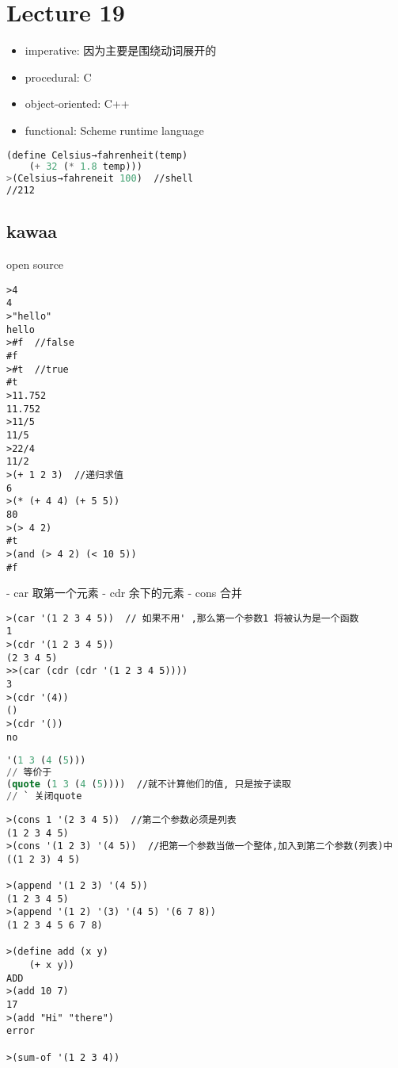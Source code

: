 \documentclass{article}
\begin{document}
\section{Lecture 19}
\begin{itemize}
\item imperative: 因为主要是围绕动词展开的
\item procedural: C
\item object-oriented: C++
\item functional: Scheme runtime language
\end{itemize}

\begin{lstlisting}[language = Lisp]
(define Celsius→fahrenheit(temp)
	(+ 32 (* 1.8 temp)))
>(Celsius→fahreneit 100)  //shell
//212
\end{lstlisting}

\subsection{kawaa}
open source
\begin{verbatim}
>4
4
>"hello"
hello
>#f  //false
#f
>#t  //true
#t
>11.752
11.752
>11/5
11/5
>22/4
11/2
>(+ 1 2 3)  //递归求值
6
>(* (+ 4 4) (+ 5 5))
80
>(> 4 2)
#t
>(and (> 4 2) (< 10 5))
#f
\end{verbatim}

- car 取第一个元素
- cdr 余下的元素
- cons 合并

\begin{verbatim}
>(car '(1 2 3 4 5))  // 如果不用' ,那么第一个参数1 将被认为是一个函数
1
>(cdr '(1 2 3 4 5))
(2 3 4 5)
>>(car (cdr (cdr '(1 2 3 4 5))))
3
>(cdr '(4))
()
>(cdr '())
no
\end{verbatim}

\begin{lstlisting}[language = Lisp]
'(1 3 (4 (5)))
// 等价于
(quote (1 3 (4 (5))))  //就不计算他们的值, 只是按子读取
// ` 关闭quote
\end{lstlisting}

\begin{verbatim}
>(cons 1 '(2 3 4 5))  //第二个参数必须是列表
(1 2 3 4 5)
>(cons '(1 2 3) '(4 5))  //把第一个参数当做一个整体,加入到第二个参数(列表)中
((1 2 3) 4 5)

>(append '(1 2 3) '(4 5))
(1 2 3 4 5)
>(append '(1 2) '(3) '(4 5) '(6 7 8))
(1 2 3 4 5 6 7 8)

>(define add (x y)
	(+ x y))
ADD
>(add 10 7)
17
>(add "Hi" "there")
error

>(sum-of '(1 2 3 4))
\end{verbatim}
\end{document}
